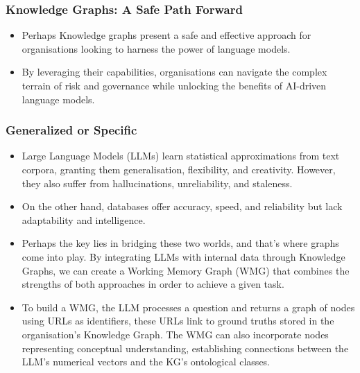 \begin{frame}[fragile]\frametitle{Knowledge Graphs: A Safe Path Forward}
\begin{itemize}
\item Perhaps Knowledge graphs present a safe and effective approach for organisations looking to harness the power of language models.
\item By leveraging their capabilities, organisations can navigate the complex terrain of risk and governance while unlocking the benefits of AI-driven language models.
\end{itemize}
\end{frame}

\begin{frame}[fragile]\frametitle{Generalized or Specific}
\begin{itemize}
\item Large Language Models (LLMs) learn statistical approximations from text corpora, granting them generalisation, flexibility, and creativity. However, they also suffer from hallucinations, unreliability, and staleness.
\item On the other hand, databases offer accuracy, speed, and reliability but lack adaptability and intelligence.
\item Perhaps the key lies in bridging these two worlds, and that's where graphs come into play. By integrating LLMs with internal data through Knowledge Graphs, we can create a Working Memory Graph (WMG) that combines the strengths of both approaches in order to achieve a given task.
\item To build a WMG, the LLM processes a question and returns a graph of nodes using URLs as identifiers, these URLs link to ground truths stored in the organisation's Knowledge Graph. The WMG can also incorporate nodes representing conceptual understanding, establishing connections between the LLM's numerical vectors and the KG's ontological classes.
\end{itemize}
\end{frame}


